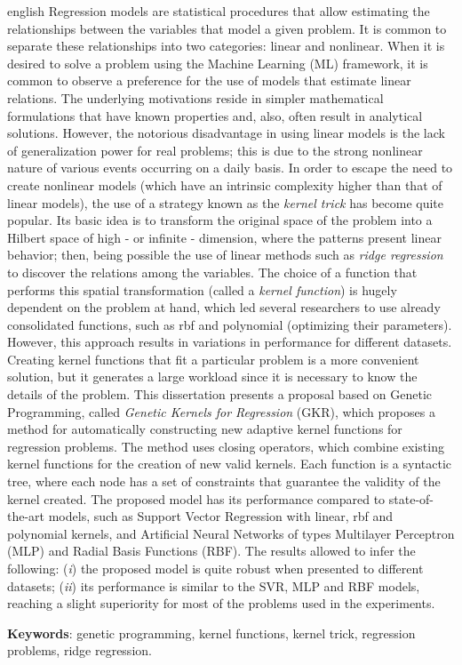 \setlength{\absparsep}{18pt} %
\begin{resumo}[Abstract]
    \begin{otherlanguage*}{english}
        Regression models are statistical procedures that allow estimating the relationships between the variables that model a given problem. It is common to separate these relationships into two categories: linear and nonlinear. When it is desired to solve a problem using the Machine Learning (ML) framework, it is common to observe a preference for the use of models that estimate linear relations. The underlying motivations reside in simpler mathematical formulations that have known properties and, also, often result in analytical solutions. However, the notorious disadvantage in using linear models is the lack of generalization power for real problems; this is due to the strong nonlinear nature of various events occurring on a daily basis. In order to escape the need to create nonlinear models (which have an intrinsic complexity higher than that of linear models), the use of a strategy known as the \textit{kernel trick} has become quite popular. Its basic idea is to transform the original space of the problem into a Hilbert space of high - or infinite - dimension, where the patterns present linear behavior; then, being possible the use of linear methods such as \textit{ridge regression} to discover the relations among the variables. The choice of a function that performs this spatial transformation (called a \textit{kernel function}) is hugely dependent on the problem at hand, which led several researchers to use already consolidated functions, such as rbf and polynomial (optimizing their parameters). However, this approach results in variations in performance for different datasets. Creating kernel functions that fit a particular problem is a more convenient solution, but it generates a large workload since it is necessary to know the details of the problem. This dissertation presents a proposal based on Genetic Programming, called \textit{Genetic Kernels for Regression} (GKR), which proposes a method for automatically constructing new adaptive kernel functions for regression problems. The method uses closing operators, which combine existing kernel functions for the creation of new valid kernels. Each function is a syntactic tree, where each node has a set of constraints that guarantee the validity of the kernel created. The proposed model has its performance compared to state-of-the-art models, such as Support Vector Regression with linear, rbf and polynomial kernels, and Artificial Neural Networks of types Multilayer Perceptron (MLP) and Radial Basis Functions (RBF). The results allowed to infer the following: (\textit{i}) the proposed model is quite robust when presented to different datasets; (\textit{ii}) its performance is similar to the SVR, MLP and RBF models, reaching a slight superiority for most of the problems used in the experiments.

        \noindent
        \textbf{Keywords}: genetic programming, kernel functions, kernel trick, regression problems, ridge regression.
    \end{otherlanguage*}
\end{resumo}